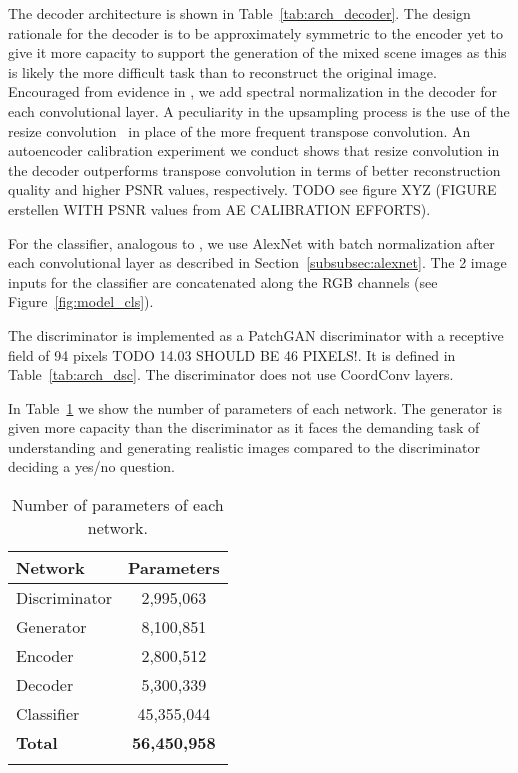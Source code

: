 \documentclass[12pt,a4paper]{article}
\begin{document}
The decoder architecture is shown in Table~\ref{tab:arch_decoder}. The design rationale for the decoder is to be approximately symmetric to the encoder yet to give it more capacity to support the generation of the mixed scene images as this is likely the more difficult task than to reconstruct the original image. Encouraged from evidence in \cite{SAGAN}, we add spectral normalization in the decoder for each convolutional layer. A peculiarity in the upsampling process is the use of the resize convolution~\cite{ResizeConv} in place of the more frequent transpose convolution. An autoencoder calibration experiment we conduct shows that resize convolution in the decoder outperforms transpose convolution in terms of better reconstruction quality and higher PSNR values, respectively. TODO see figure XYZ (FIGURE erstellen WITH PSNR values from AE CALIBRATION EFFORTS).



For the classifier, analogous to \cite{DisentFacOfVarByMixTh}, we use AlexNet with batch normalization after each convolutional layer as described in Section~\ref{subsubsec:alexnet}. The 2 image inputs for the classifier are concatenated along the RGB channels (see Figure~\ref{fig:model_cls}).

The discriminator is implemented as a PatchGAN discriminator with a receptive field of 94 pixels TODO 14.03 SHOULD BE 46 PIXELS!. It is defined in Table~\ref{tab:arch_dsc}. The discriminator does not use CoordConv layers.



In Table~\ref{tab:params} we show the number of parameters of each network. The generator is given more capacity than the discriminator as it faces the demanding task of understanding and generating realistic images compared to the discriminator deciding a yes/no question.
\begin{table} [ht!]
\centering
\begin{tabular}{l|c}
\Xhline{0.8pt}
\textbf{Network} & \textbf{Parameters}\\
\hline
Discriminator & 2,995,063 \\
\hline
Generator & 8,100,851 \\
\hline
Encoder & 2,800,512 \\
\hline
Decoder & 5,300,339 \\
\hline
Classifier & 45,355,044 \\
\hline
\textbf{Total} & \textbf{56,450,958} \\
\Xhline{0.8pt}
\end{tabular}
\caption{Number of parameters of each network.} \label{tab:params}
\end{table}
\end{document}
